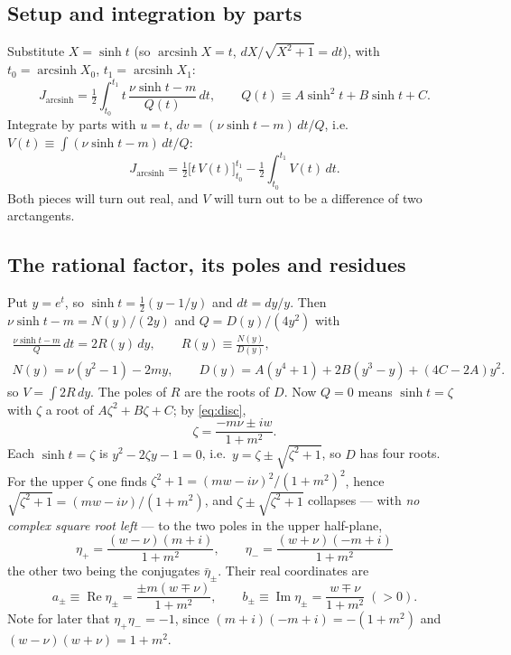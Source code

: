 \documentclass[11pt]{article}
\numberwithin{equation}{section}
\newcommand{\half}{\tfrac{1}{2}}
\DeclareMathOperator{\arcsinh}{arcsinh}
\begin{document}
\subsection{Setup and integration by parts}
Substitute $X=\sinh t$ (so $\arcsinh X=t$, $dX/\sqrt{X^2+1}=dt$), with
$t_0=\arcsinh X_0$, $t_1=\arcsinh X_1$:
\begin{equation}\label{eq:Jt}
  J_{\arcsinh}=\half\int_{t_0}^{t_1}t\,\frac{\nu\sinh t-m}{Q(t)}\,dt,
  \qquad Q(t)\equiv A\sinh^2t+B\sinh t+C .
\end{equation}
Integrate by parts with $u=t$, $dv=(\nu\sinh t-m)\,dt/Q$, i.e.\ $V(t)\equiv\int(\nu\sinh t-m)\,dt/Q$:
\begin{equation}\label{eq:Jibp}
  J_{\arcsinh}=\half\big[t\,V(t)\big]_{t_0}^{t_1}-\half\int_{t_0}^{t_1}V(t)\,dt .
\end{equation}
Both pieces will turn out real, and $V$ will turn out to be a difference of two arctangents.

\subsection{The rational factor, its poles and residues}
Put $y=e^t$, so $\sinh t=\half(y-1/y)$ and $dt=dy/y$. Then
$\nu\sinh t-m=N(y)/(2y)$ and $Q=D(y)/(4y^2)$ with
\begin{equation}\label{eq:R}
\begin{gathered}
  \frac{\nu\sinh t-m}{Q}\,dt=2R(y)\,dy,\qquad R(y)\equiv\frac{N(y)}{D(y)},\\
  N(y)=\nu(y^2-1)-2my,\qquad D(y)=A(y^4+1)+2B(y^3-y)+(4C-2A)y^2 .
\end{gathered}
\end{equation}
so $V=\int 2R\,dy$. The poles of $R$ are the roots of $D$. Now $Q=0$ means $\sinh t=\zeta$ with $\zeta$
a root of $A\zeta^2+B\zeta+C$; by \eqref{eq:disc},
\begin{equation}\label{eq:zeta}
  \zeta=\frac{-m\nu\pm iw}{1+m^2}.
\end{equation}
Each $\sinh t=\zeta$ is $y^2-2\zeta y-1=0$, i.e.\ $y=\zeta\pm\sqrt{\zeta^2+1}$, so $D$ has four roots.
For the upper $\zeta$ one finds $\zeta^2+1=(mw-i\nu)^2/(1+m^2)^2$, hence
$\sqrt{\zeta^2+1}=(mw-i\nu)/(1+m^2)$, and $\zeta\pm\sqrt{\zeta^2+1}$ collapses --- with \emph{no
complex square root left} --- to the two poles in the upper half-plane,
\begin{equation}\label{eq:eta}
  \boxed{\;\eta_+=\frac{(w-\nu)(m+i)}{1+m^2},\qquad \eta_-=\frac{(w+\nu)(-m+i)}{1+m^2}\;}
\end{equation}
the other two being the conjugates $\bar\eta_\pm$. Their real coordinates are
\begin{equation}\label{eq:ab}
  a_\pm\equiv\operatorname{Re}\eta_\pm=\frac{\pm m(w\mp\nu)}{1+m^2},\qquad
  b_\pm\equiv\operatorname{Im}\eta_\pm=\frac{w\mp\nu}{1+m^2}\;(>0).
\end{equation}
Note for later that $\eta_+\eta_-=-1$, since $(m+i)(-m+i)=-(1+m^2)$ and $(w-\nu)(w+\nu)=1+m^2$.
\end{document}
